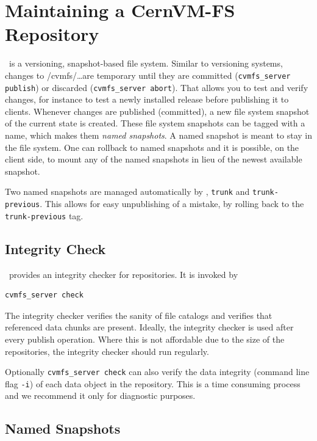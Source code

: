 \section{Maintaining a CernVM-FS Repository}

\cvmfs\ is a versioning, snapshot-based file system.
Similar to versioning systems, changes to /cvmfs/\dots are temporary until they are committed (\texttt{cvmfs\_server publish}) or discarded (\texttt{cvmfs\_server abort}).
That allows you to test and verify changes, for instance to test a newly installed release before publishing it to clients.
Whenever changes are published (committed), a new file system snapshot of the current state is created.
These file system snapshots can be tagged with a name, which makes them \emph{named snapshots}.
A named snapshot is meant to stay in the file system.
One can rollback to named snapshots and it is possible, on the client side, to mount any of the named snapshots in lieu of the newest available snapshot.

Two named snapshots are managed automatically by \cvmfs, \texttt{trunk} and \texttt{trunk-previous}.
This allows for easy unpublishing of a mistake, by rolling back to the \texttt{trunk-previous} tag.

\subsection{Integrity Check}
\label{sct:checkintegrity}
\cvmfs\ provides an integrity checker for repositories.
It is invoked by
\begin{verbatim}
cvmfs_server check
\end{verbatim}

The integrity checker verifies the sanity of file catalogs and verifies that referenced data chunks are present.
Ideally, the integrity checker is used after every publish operation.
Where this is not affordable due to the size of the repositories, the integrity checker should run regularly.

Optionally \texttt{cvmfs\_server check} can also verify the data integrity (command line flag \texttt{-i}) of each data object in the repository.
This is a time consuming process and we recommend it only for diagnostic purposes.


\subsection{Named Snapshots}
\label{sct:namedsnapshots}

